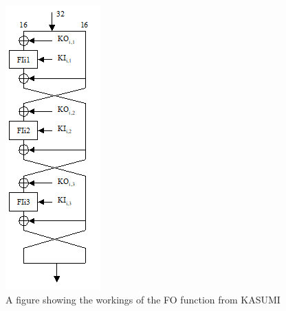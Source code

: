 \documentclass[10pt,journal,compsoc]{IEEEtran}
\begin{document}
\begin{appendices}
\begin{figure}[H]
    \centering
    \includegraphics[width=\linewidth, height=\textheight, keepaspectratio]{Figures/FO_diag.png}
    \caption{A figure showing the workings of the FO function from KASUMI}
    \label{fig:kasumi-FO}
\end{figure}


\end{appendices}
\end{document}
